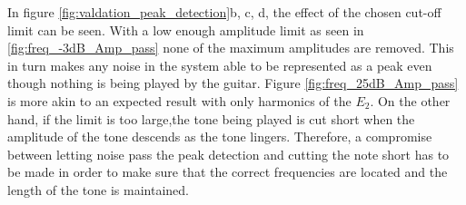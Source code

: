 In figure \ref{fig:valdation_peak_detection}b, c, d, the effect of the chosen cut-off limit can be seen.
With a low enough amplitude limit as seen in \ref{fig:freq_-3dB_Amp_pass} none of the maximum amplitudes are removed.
This in turn makes any noise in the system able to be represented as a peak even though nothing is being played by the guitar.
Figure \ref{fig:freq_25dB_Amp_pass} is more akin to an expected result with only harmonics of the $E_2$.
On the other hand, if the limit is too large,the tone being played is cut short when the amplitude of the tone descends as the tone lingers.
Therefore, a compromise between letting noise pass the peak detection and cutting the note short has to be made in order to make sure that the correct frequencies are  located and the length of the tone is maintained.